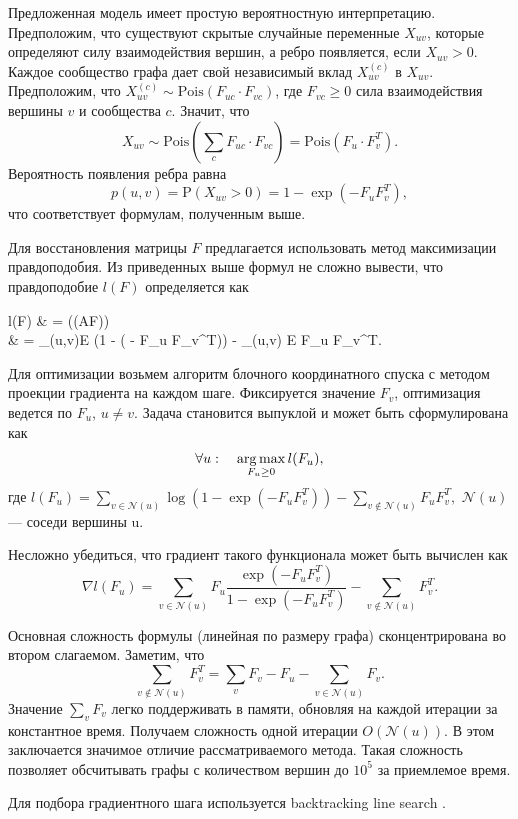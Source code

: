 \documentclass{ITaSconf}
\newcommand{\argmax}{\mathop{\rm arg\,max}\limits}
\def\PP{\mathrm{P}}
\begin{document}
	Предложенная модель имеет простую вероятностную интерпретацию. 
	Предположим, что существуют скрытые случайные переменные $X_{uv}$, которые определяют силу взаимодействия вершин, а ребро появляется, если  $X_{uv} > 0$.
	Каждое сообщество графа дает свой независимый вклад $X_{uv}^{(c)}$ в $X_{uv}$.
	Предположим, что $X_{uv}^{(c)} \sim \mathrm{Pois}(F_{uc} \cdot F_{vc})$, где $F_{vc}\ge 0$ сила взаимодействия вершины $v$ и сообщества $c$. 
	Значит, что 
	$$X_{uv} \sim \mathrm{Pois}(\sum_{c} F_{uc} \cdot F_{vc}) = \mathrm{Pois}(F_{u} \cdot F_{v}^T).$$
	Вероятность появления ребра равна 
	$$p(u,v) = \PP(X_{uv} > 0) = 1 - \exp( - F_{u} F_{v}^T),$$
	что соответствует формулам, полученным выше.
	
	Для восстановления матрицы $F$ предлагается использовать метод максимизации правдоподобия.
	Из приведенных выше формул не сложно вывести, что правдоподобие $l(F)$ определяется как
	\begin{flalign*}
	l(F) & = \log(\PP(A\mid F)) \\
	& = \sum_{(u,v)\in E} \log(1 - \exp( - F_{u} F_{v}^T)) - \sum_{(u,v) \notin E} F_u F_v^T.
	\end{flalign*}
	
	Для оптимизации возьмем алгоритм блочного координатного спуска с методом проекции градиента на каждом шаге.
	Фиксируется значение $F_v$, оптимизация ведется по $F_u$, $u \ne v$. Задача становится выпуклой и может быть сформулирована как
	$$\forall u: \quad \argmax_{F_u \ge 0} l(F_u), $$
	где 
	$\displaystyle l(F_u) = \sum_{v \in \mathcal{N}(u)} \log(1-\exp(-F_u F_v^T)) - \sum_{v \notin \mathcal{N}(u)} F_u F_v^T, $
	$\mathcal{N}(u)$ — соседи вершины u.
	
	Несложно убедиться, что градиент такого функционала может быть вычислен как
	$$\nabla l(F_u) = \sum_{v \in \mathcal{N}(u)} F_u \dfrac{\exp(-F_u F_v^T)}{1-\exp(-F_u F_v^T)} - \sum_{v \notin \mathcal{N}(u)} F_v^T. $$
	
	Основная сложность формулы (линейная по размеру графа) сконцентрирована во втором слагаемом. Заметим, что 
	$$\sum_{v \notin \mathcal{N}(u)} F_v^T = \sum_v{F_v} - F_u - \sum_{v\in \mathcal{N}(u)} F_v.$$ 
	Значение $\sum_v{F_v}$ легко поддерживать в памяти, обновляя на каждой итерации за константное время. Получаем сложность одной итерации $O(\mathcal{N}(u))$. 
	В этом заключается значимое отличие рассматриваемого метода. 
	Такая сложность позволяет обсчитывать графы с количеством вершин до $10^5$ за приемлемое время.
	
	Для подбора градиентного шага используется backtracking line search \cite{boyd2004convex}.
	
\end{document}
